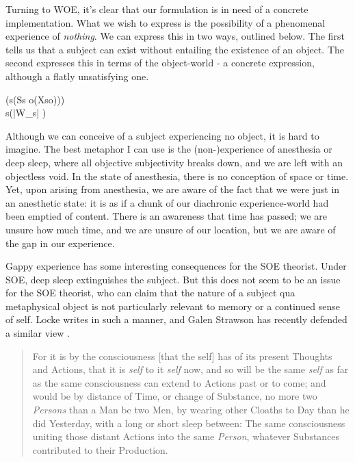\documentclass[leqno]{article}
\newcounter{lemma}
\begin{document}
	Turning to WOE, it's clear that our formulation is in need of a concrete implementation.
	What we wish to express is the possibility of a phenomenal experience of \emph{nothing}.
	We can express this in two ways, outlined below. The first tells us that a
	subject can exist without entailing the existence of an object. The second expresses
	this in terms of the object-world - a concrete expression, although a flatly
	unsatisfying one.
	\begin{lemmalist}
		[WOE.][woe] \label{lemma:woe1} (\exists s(Ss \land \neg \exists o(Xso)))
		\\ \label{lemma:woe2} \forall s(|W_s| )
	\end{lemmalist}

	Although we can conceive of a subject experiencing no object, it is hard to imagine.
	The best metaphor I can use is the (non-)experience of anesthesia or deep
	sleep, where all objective subjectivity breaks down, and we are left with an
	objectless void. In the state of anesthesia, there is no conception of space
	or time. Yet, upon arising from anesthesia, we are aware of the fact that we were
	just in an anesthetic state: it is as if a chunk of our diachronic experience-world
	had been emptied of content. There is an awareness that time has passed; we
	are unsure how much time, and we are unsure of our location, but we are aware
	of the gap in our experience.

	Gappy experience has some interesting consequences for the SOE theorist. Under
	SOE, deep sleep extinguishes the subject. But this does not seem to be an issue
	for the SOE theorist, who can claim that the nature of a subject qua
	metaphysical object is not particularly relevant to memory or a continued
	sense of self. Locke writes in such a manner, and Galen Strawson has recently
	defended a similar view \autocite[ch. 12]{strawson2017}.

	\blockquote[{\cite[2.27.10]{locke2000}}]{ For it is by the consciousness [that the self] has of its present Thoughts and Actions, that it is \emph{self} to it \emph{self} now, and so will be the same \emph{self} as far as the same consciousness can extend to Actions past or to come; and would be by distance of Time, or change of Substance, no more two \emph{Persons} than a Man be two Men, by wearing other Cloaths to Day than he did Yesterday, with a long or short sleep between: The same consciousness uniting those distant Actions into the same \emph{Person}, whatever Substances contributed to their Production. }
\end{document}

